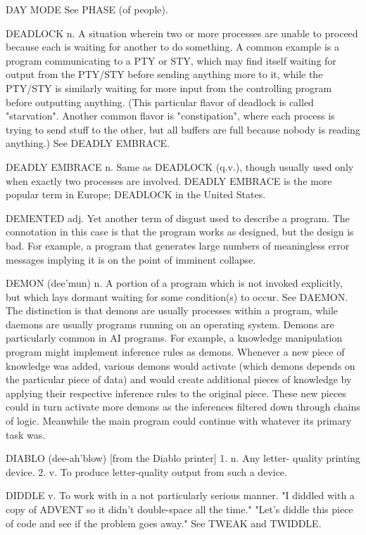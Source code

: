 DAY MODE  See PHASE (of people).

DEADLOCK n. A situation wherein two or more processes are unable to
   proceed because each is waiting for another to do something.	 A
   common example is a program communicating to a PTY or STY, which
   may find itself waiting for output from the PTY/STY before sending
   anything more to it, while the PTY/STY is similarly waiting for
   more input from the controlling program before outputting anything.
   (This particular flavor of deadlock is called "starvation".
   Another common flavor is "constipation", where each process is
   trying to send stuff to the other, but all buffers are full because
   nobody is reading anything.)	 See DEADLY EMBRACE.

DEADLY EMBRACE n. Same as DEADLOCK (q.v.), though usually used only
   when exactly two processes are involved.  DEADLY EMBRACE is the
   more popular term in Europe; DEADLOCK in the United States.

DEMENTED adj. Yet another term of disgust used to describe a program.
   The connotation in this case is that the program works as designed,
   but the design is bad.  For example, a program that generates large
   numbers of meaningless error messages implying it is on the point
   of imminent collapse.

DEMON (dee'mun) n. A portion of a program which is not invoked
   explicitly, but which lays dormant waiting for some condition(s) to
   occur.  See DAEMON.	The distinction is that demons are usually
   processes within a program, while daemons are usually programs
   running on an operating system.  Demons are particularly common in
   AI programs.	 For example, a knowledge manipulation program might
   implement inference rules as demons.	 Whenever a new piece of
   knowledge was added, various demons would activate (which demons
   depends on the particular piece of data) and would create
   additional pieces of knowledge by applying their respective
   inference rules to the original piece.  These new pieces could in
   turn activate more demons as the inferences filtered down through
   chains of logic.  Meanwhile the main program could continue with
   whatever its primary task was.

DIABLO (dee-ah'blow) [from the Diablo printer] 1. n. Any letter-
   quality printing device.  2. v. To produce letter-quality output
   from such a device.

DIDDLE v. To work with in a not particularly serious manner.  "I
   diddled with a copy of ADVENT so it didn't double-space all the
   time."  "Let's diddle this piece of code and see if the problem
   goes away."	See TWEAK and TWIDDLE.

